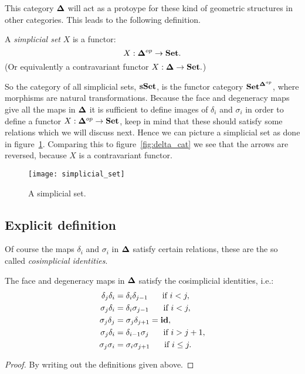 This category $\mathbf{\Delta}$ will act as a protoype for these kind of geometric structures in other categories. This leads to the following definition.

\begin{definition}
	A \emph{simplicial set} $X$ is a functor:
	$$X: \mathbf{\Delta}^{op} \to \mathbf{Set}.$$
	(Or equivalently a contravariant functor $X: \mathbf{\Delta} \to \mathbf{Set}.$)
\end{definition}

So the category of all simplicial sets, $\mathbf{sSet}$, is the functor category $\mathbf{Set}^{\mathbf{\Delta}^{op}}$, where morphisms are natural transformations. Because the face and degeneracy maps give all the maps in $\mathbf{\Delta}$ it is sufficient to define images of $\delta_i$ and $\sigma_i$ in order to define a functor $X: \mathbf{\Delta}^{op} \to \mathbf{Set}$, keep in mind that these should satisfy some relations which we will discuss next. Hence we can picture a simplicial set as done in figure~\ref{fig:simplicial_set}. Comparing this to figure~\ref{fig:delta_cat} we see that the arrows are reversed, because $X$ is a contravariant functor.

\begin{figure}
	\texttt{[image: simplicial\_set]}
	\caption{A simplicial set.}
	\label{fig:simplicial_set}
\end{figure}


\subsection{Explicit definition}
Of course the maps $\delta_i$ and $\sigma_i$ in $\mathbf{\Delta}$ satisfy certain relations, these are the so called \emph{cosimplicial identities}.

\begin{lemma}
	The face and degeneracy maps in $\mathbf{\Delta}$ satisfy the cosimplicial identities, i.e.:
	\begin{align}
		\delta_j\delta_i &= \delta_i\delta_{j-1}  \hspace{0.5cm} \text{ if } i < j,\\
		\sigma_j\delta_i &= \delta_i\sigma_{j-1}  \hspace{0.5cm} \text{ if } i < j,\\
		\sigma_j\delta_j &= \sigma_j\delta_{j+1} = \mathbf{id},\\
		\sigma_j\delta_i &= \delta_{i-1}\sigma_j  \hspace{0.5cm} \text{ if } i > j+1,\\
		\sigma_j\sigma_i &= \sigma_i\sigma_{j+1}  \hspace{0.5cm} \text{ if } i \leq j.
	\end{align}
\end{lemma}
\begin{proof}
	By writing out the definitions given above. 
\end{proof}

